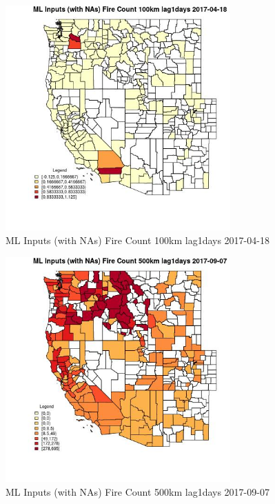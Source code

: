 \begin{figure} 
\centering  
\includegraphics[width=0.77\textwidth]{Code_Outputs/Report_ML_input_PM25_Step4_part_e_de_duplicated_aves_compiled_2019-05-21wNAs_CountyFire_Count_100km_lag1daysMean2017-04-18.jpg} 
\caption{\label{fig:Report_ML_input_PM25_Step4_part_e_de_duplicated_aves_compiled_2019-05-21wNAsCountyFire_Count_100km_lag1daysMean2017-04-18}ML Inputs (with NAs) Fire Count 100km lag1days 2017-04-18} 
\end{figure} 
 

\begin{figure} 
\centering  
\includegraphics[width=0.77\textwidth]{Code_Outputs/Report_ML_input_PM25_Step4_part_e_de_duplicated_aves_compiled_2019-05-21wNAs_CountyFire_Count_500km_lag1daysMean2017-09-07.jpg} 
\caption{\label{fig:Report_ML_input_PM25_Step4_part_e_de_duplicated_aves_compiled_2019-05-21wNAsCountyFire_Count_500km_lag1daysMean2017-09-07}ML Inputs (with NAs) Fire Count 500km lag1days 2017-09-07} 
\end{figure} 
 

